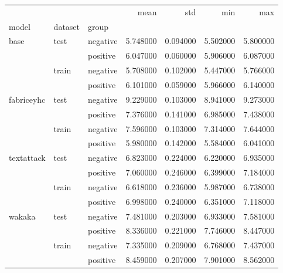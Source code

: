 \begin{tabular}{lllrrrr}
 &  &  & mean & std & min & max \\
model & dataset & group &  &  &  &  \\
\multirow[c]{4}{*}{base} & \multirow[c]{2}{*}{test} & negative & 5.748000 & 0.094000 & 5.502000 & 5.800000 \\
 &  & positive & 6.047000 & 0.060000 & 5.906000 & 6.087000 \\
 & \multirow[c]{2}{*}{train} & negative & 5.708000 & 0.102000 & 5.447000 & 5.766000 \\
 &  & positive & 6.101000 & 0.059000 & 5.966000 & 6.140000 \\
\multirow[c]{4}{*}{fabriceyhc} & \multirow[c]{2}{*}{test} & negative & 9.229000 & 0.103000 & 8.941000 & 9.273000 \\
 &  & positive & 7.376000 & 0.141000 & 6.985000 & 7.438000 \\
 & \multirow[c]{2}{*}{train} & negative & 7.596000 & 0.103000 & 7.314000 & 7.644000 \\
 &  & positive & 5.980000 & 0.142000 & 5.584000 & 6.041000 \\
\multirow[c]{4}{*}{textattack} & \multirow[c]{2}{*}{test} & negative & 6.823000 & 0.224000 & 6.220000 & 6.935000 \\
 &  & positive & 7.060000 & 0.246000 & 6.399000 & 7.184000 \\
 & \multirow[c]{2}{*}{train} & negative & 6.618000 & 0.236000 & 5.987000 & 6.738000 \\
 &  & positive & 6.998000 & 0.240000 & 6.351000 & 7.118000 \\
\multirow[c]{4}{*}{wakaka} & \multirow[c]{2}{*}{test} & negative & 7.481000 & 0.203000 & 6.933000 & 7.581000 \\
 &  & positive & 8.336000 & 0.221000 & 7.746000 & 8.447000 \\
 & \multirow[c]{2}{*}{train} & negative & 7.335000 & 0.209000 & 6.768000 & 7.437000 \\
 &  & positive & 8.459000 & 0.207000 & 7.901000 & 8.562000 \\
\end{tabular}
